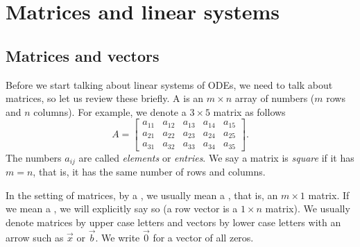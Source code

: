
\sectionnewpage
\section{Matrices and linear systems} \label{sec:matrix}



\subsection{Matrices and vectors}

Before we start talking about linear systems of ODEs, we need to
talk about matrices, so let us review these briefly.  A \emph{}
is an $m
\times n$ array of numbers ($m$ rows and $n$ columns).  For example, we denote
a $3 \times 5$ matrix as follows
\begin{equation*}
A = 
\begin{bmatrix}
a_{11} & a_{12} & a_{13} & a_{14} & a_{15} \\
a_{21} & a_{22} & a_{23} & a_{24} & a_{25} \\
a_{31} & a_{32} & a_{33} & a_{34} & a_{35}
\end{bmatrix} .
\end{equation*}
The numbers $a_{ij}$ are called \emph{elements}
or \emph{entries}.
We say a matrix is \emph{square}
if it has $m=n$, that is, it has the same number of rows and columns.

In the setting of matrices,
by a \emph{}, we usually mean a
\emph{}, that is, an $m \times 1$ matrix.
If we mean a \emph{},
we will explicitly say so (a row vector is a $1 \times n$ matrix).
We usually denote
matrices by upper case letters and vectors by lower case letters with an
arrow such as $\vec{x}$ or $\vec{b}$.  We write $\vec{0}$ for a vector of all zeros.

